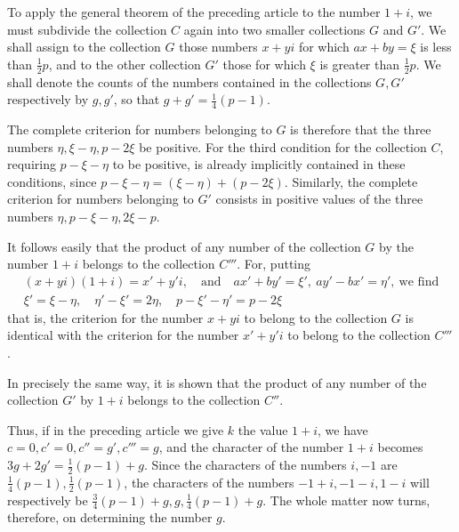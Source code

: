 %
To apply the general theorem of the preceding article to the number $1+i$, we must subdivide the collection $C$ again into two smaller collections $G$ and $G'$. We shall assign to the collection $G$ those numbers $x+yi$ for which $ax+by=\xi$ is less than $\frac12p$, and to the other collection $G'$ those for which $\xi$ is greater than $\frac12p$. We shall denote the counts of the numbers contained in the collections $G,G'$ respectively by $g,g'$, so that $g+g'=\frac14(p-1)$.

The complete criterion for numbers belonging to $G$ is therefore that the three numbers $\eta,\xi-\eta,p-2\xi$ be positive. For the third condition for the collection $C$, requiring $p-\xi-\eta$ to be positive, is already implicitly contained in these conditions, since $p-\xi-\eta=(\xi-\eta)+(p-2\xi)$. Similarly, the complete criterion for numbers belonging to $G'$ consists in positive values of the three numbers $\eta,p-\xi-\eta,2\xi-p$.

It follows easily that the product of any number of the collection $G$ by the number $1+i$ belongs to the collection $C'''$. For, putting
\[
\begin{gathered}
(x+yi)(1+i)=x'+y'i,\quad\text{and}\quad ax'+by'=\xi',\ ay'-bx'=\eta',\ \text{we find}\\
\xi'=\xi-\eta,\quad\eta'-\xi'=2\eta,\quad p-\xi'-\eta'=p-2\xi
\end{gathered}
\]
that is, the criterion for the number $x+yi$ to belong to the collection $G$ is identical with the criterion for the number $x'+y'i$ to belong to the collection $C'''$.

In precisely the same way, it is shown that the product of any number of the collection $G'$ by $1+i$ belongs to the collection $C''$.

Thus, if in the preceding article we give $k$ the value $1+i$, we have $c=0,c'=0,c''=g',c'''=g$, and the character of the number $1+i$ becomes $3g+2g'=\frac12(p-1)+g$. Since the characters of the numbers $i,-1$ are $\frac14(p-1),\frac12(p-1)$, the characters of the numbers $-1+i,-1-i,1-i$ will respectively be $\frac34(p-1)+g,g,\frac14(p-1)+g$. The whole matter now turns, therefore, on determining the number $g$.
